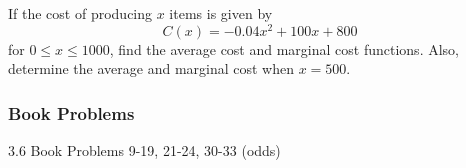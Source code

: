 \documentclass[cal1spr16Lectures.tex]{subfiles}
\begin{document}
\begin{frame}
\begin{exe} If the cost of producing $x$ items is given by 
\[C(x)=-0.04x^2+100x+800\]
for $0 \le x \le 1000$, find the average cost and marginal cost functions.  Also, determine the average and marginal cost when $x=500.$ \end{exe}
\end{frame}

\subsubsection{Book Problems}

\begin{frame}
\begin{block}{3.6 Book Problems} 9-19, 21-24, 30-33 (odds) \end{block}
\end{frame}
\end{document}
